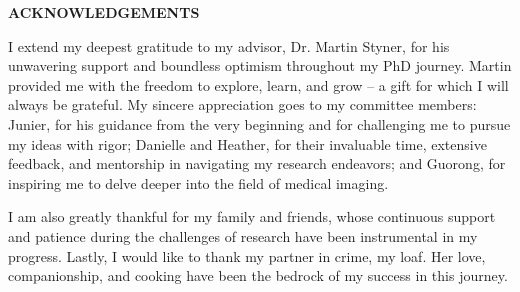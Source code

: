 
\begin{center}
\vspace*{52pt}
{\normalfont \textbf{ACKNOWLEDGEMENTS}}
\end{center}


I extend my deepest gratitude to my advisor, Dr. Martin Styner, for his unwavering support and boundless optimism throughout my PhD journey. Martin provided me with the freedom to explore, learn, and grow – a gift for which I will always be grateful.
My sincere appreciation goes to my committee members: Junier, for his guidance from the very beginning and for challenging me to pursue my ideas with rigor; Danielle and Heather, for their invaluable time, extensive feedback, and mentorship in navigating my research endeavors; and
Guorong, for inspiring me to delve deeper into the field of medical imaging.

I am also greatly thankful for my family and friends, whose continuous support and patience during the challenges of research have been instrumental in my progress. Lastly, I would like to thank my partner in crime, my loaf. Her love, companionship, and cooking have been the bedrock of my success in this journey.


\clearpage
